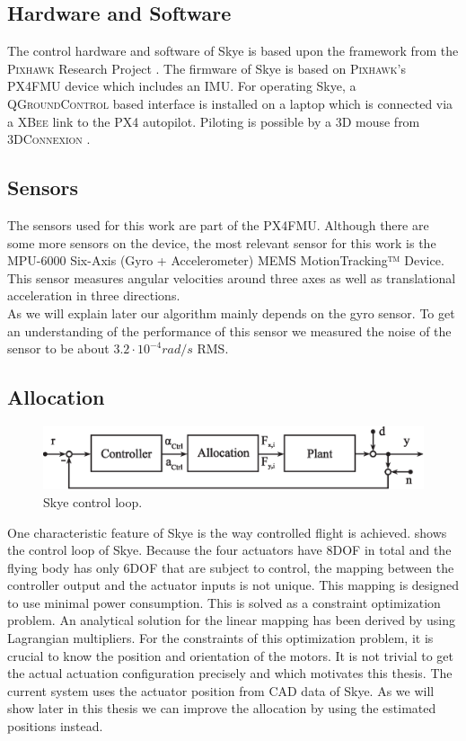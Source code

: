 \subsection{Hardware and Software}
The control hardware and software of Skye is based upon the framework from the \textsc{Pixhawk} Research Project \citep{pixhawk}.
The firmware of Skye is based on \textsc{Pixhawk}'s PX4FMU device which includes an IMU.
For operating Skye, a \textsc{QGroundControl} based interface is installed on a laptop
which is connected via a \textsc{XBee} link to the PX4 autopilot.
Piloting is possible by a 3D mouse from \textsc{3DConnexion} \citep[see][]{Krebs2012}.

\subsection{Sensors}
The sensors used for this work are part of the PX4FMU.
Although there are some more sensors on the device, the most relevant sensor for this work is the MPU-6000 Six-Axis (Gyro + Accelerometer) MEMS MotionTracking™ Device.
This sensor measures angular velocities around three axes as well as translational acceleration in three directions. \\
As we will explain later our algorithm mainly depends on the gyro sensor.
To get an understanding of the performance of this sensor we measured the noise of the sensor to be about $3.2 \cdot 10^{-4}rad/s$ RMS.

\subsection{Allocation}

\begin{figure}[hbtp]
\centering
\includegraphics[width=.9\linewidth]{images/system_loop_3.eps}
\caption{Skye control loop.}
\label{fig:system_loop_3}
\end{figure}

One characteristic feature of Skye is the way controlled flight is achieved. 
 shows the control loop of Skye.
Because the four actuators have 8DOF in total and the flying body has only 6DOF that are subject to control,
the mapping between the controller output and the actuator inputs is not unique.
This mapping is designed to use minimal power consumption.
This is solved as a constraint optimization problem.
An analytical solution for the linear mapping has been derived by \citet{Schaffner2012} using Lagrangian multipliers.
For the constraints of this optimization problem, it is crucial to know the position and orientation of the motors.
It is not trivial to get the actual actuation configuration precisely and which motivates this thesis.
The current system uses the actuator position from CAD data of Skye. 
As we will show later in this thesis we can improve the allocation by using the estimated positions instead.


